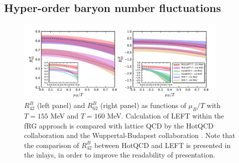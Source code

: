 \documentclass[%
reprint,
superscriptaddress,
showpacs,preprintnumbers,
amsmath,amssymb,
aps,
prd,
]{revtex4-1}
\begin{document}
	
	
	\subsection{Hyper-order baryon number fluctuations}
	\label{subsec:hyper-order}
	
	
	\begin{figure}[t]
		\includegraphics[width=0.9\textwidth]{R42R62-muBoT}
		\caption{$R^{B}_{42}$ (left panel) and $R^{B}_{62}$ (right panel) as functions of $\mu_B/T$ with $T=155$ MeV and $T=160$ MeV. Calculation of LEFT within the fRG approach is compared with lattice QCD by the HotQCD collaboration \cite{Bazavov:2020bjn} and the Wuppertal-Budapest collaboration \cite{Borsanyi:2018grb}. Note that the comparison of $R^{B}_{42}$ between HotQCD and LEFT is presented in the inlays, in order to improve the readability of presentation.}\label{fig:R42R62-muBoT}
	\end{figure}
	
\end{document}
